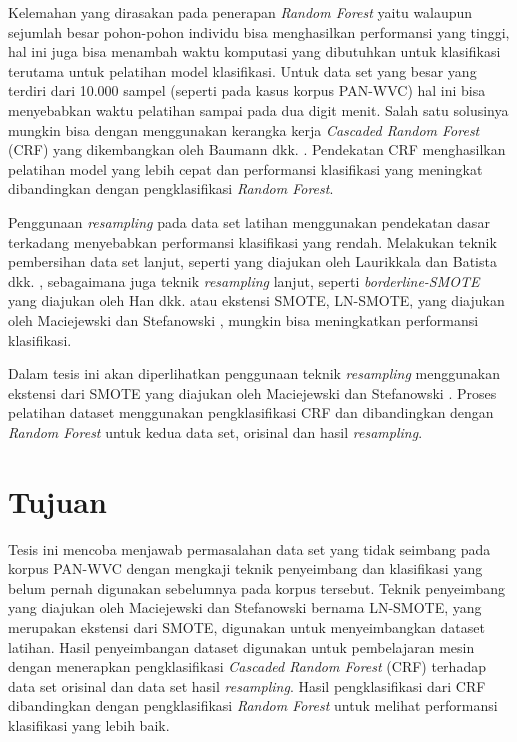 \documentclass[12pt,a4paper,titlepage]{article}
\begin{document}
Kelemahan yang dirasakan pada penerapan \textit{Random Forest} yaitu walaupun sejumlah besar pohon-pohon individu bisa menghasilkan performansi yang tinggi, hal ini juga bisa menambah waktu komputasi yang dibutuhkan untuk klasifikasi terutama untuk pelatihan model klasifikasi.
Untuk data set yang besar yang terdiri dari 10.000 sampel (seperti pada kasus korpus PAN-WVC) hal ini bisa menyebabkan waktu pelatihan sampai pada dua digit menit.
Salah satu solusinya mungkin bisa dengan menggunakan kerangka kerja \textit{Cascaded Random Forest} (CRF) yang dikembangkan oleh Baumann dkk. \cite{baumann2013cascaded}.
Pendekatan CRF menghasilkan pelatihan model yang lebih cepat dan performansi klasifikasi yang meningkat dibandingkan dengan pengklasifikasi \textit{Random Forest}.

Penggunaan \textit{resampling} pada data set latihan menggunakan pendekatan dasar terkadang menyebabkan performansi klasifikasi yang rendah.
Melakukan teknik pembersihan data set lanjut, seperti yang diajukan oleh Laurikkala \cite{laurikkala2001improving} dan Batista dkk. \cite{batista2004study}, sebagaimana juga teknik \textit{resampling} lanjut, seperti \textit{borderline-SMOTE} yang diajukan oleh Han dkk. \cite{han2005borderline} atau ekstensi SMOTE, LN-SMOTE, yang diajukan oleh Maciejewski dan Stefanowski \cite{maciejewski2011local}, mungkin bisa meningkatkan performansi klasifikasi.

Dalam tesis ini akan diperlihatkan penggunaan teknik \textit{resampling} menggunakan ekstensi dari SMOTE yang diajukan oleh Maciejewski dan Stefanowski \cite{maciejewski2011local}.
Proses pelatihan dataset menggunakan pengklasifikasi CRF dan dibandingkan dengan \textit{Random Forest} untuk kedua data set, orisinal dan hasil \textit{resampling}.


\section{Tujuan}\label{sec:tujuan}

Tesis ini mencoba menjawab permasalahan data set yang tidak seimbang pada korpus PAN-WVC dengan mengkaji teknik penyeimbang dan klasifikasi yang belum pernah digunakan sebelumnya pada korpus tersebut.
Teknik penyeimbang yang diajukan oleh Maciejewski dan Stefanowski \cite{maciejewski2011local} bernama LN-SMOTE, yang merupakan ekstensi dari SMOTE, digunakan untuk menyeimbangkan dataset latihan.
Hasil penyeimbangan dataset digunakan untuk pembelajaran mesin dengan menerapkan pengklasifikasi \textit{Cascaded Random Forest} (CRF) terhadap data set orisinal dan data set hasil \textit{resampling}.
Hasil pengklasifikasi dari CRF dibandingkan dengan pengklasifikasi \textit{Random Forest} untuk melihat performansi klasifikasi yang lebih baik.
\end{document}
